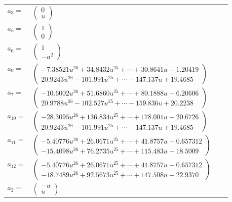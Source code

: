\documentclass[1p]{elsarticle_modified}
\theoremstyle{definition}
\begin{document}
\begin{tabular}{m{7pt} m{180pt} m{7pt} m{180pt} }
\flushright $a_{3}=$&$\begin{pmatrix}0\\u\end{pmatrix}$ \\
\flushright $a_{5}=$&$\begin{pmatrix}1\\0\end{pmatrix}$ \\
\flushright $a_{6}=$&$\begin{pmatrix}1\\- u^2\end{pmatrix}$ \\
\flushright $a_{9}=$&$\begin{pmatrix}-7.38521 u^{26}+34.8432 u^{25}+\cdots+30.8641 u-1.20419\\20.9243 u^{26}-101.991 u^{25}+\cdots-147.137 u+19.4685\end{pmatrix}$ \\
\flushright $a_{7}=$&$\begin{pmatrix}-10.6002 u^{26}+51.6860 u^{25}+\cdots+80.1888 u-6.20606\\20.9788 u^{26}-102.527 u^{25}+\cdots-159.836 u+20.2238\end{pmatrix}$ \\
\flushright $a_{10}=$&$\begin{pmatrix}-28.3095 u^{26}+136.834 u^{25}+\cdots+178.001 u-20.6726\\20.9243 u^{26}-101.991 u^{25}+\cdots-147.137 u+19.4685\end{pmatrix}$ \\
\flushright $a_{11}=$&$\begin{pmatrix}-5.40776 u^{26}+26.0671 u^{25}+\cdots+41.8757 u-0.657312\\-15.4098 u^{26}+76.2735 u^{25}+\cdots+115.483 u-18.5009\end{pmatrix}$ \\
\flushright $a_{12}=$&$\begin{pmatrix}-5.40776 u^{26}+26.0671 u^{25}+\cdots+41.8757 u-0.657312\\-18.7489 u^{26}+92.5673 u^{25}+\cdots+147.508 u-22.9370\end{pmatrix}$ \\
\flushright $a_{2}=$&$\begin{pmatrix}- u\\u\end{pmatrix}$ \\

\end{tabular}
\end{document}
